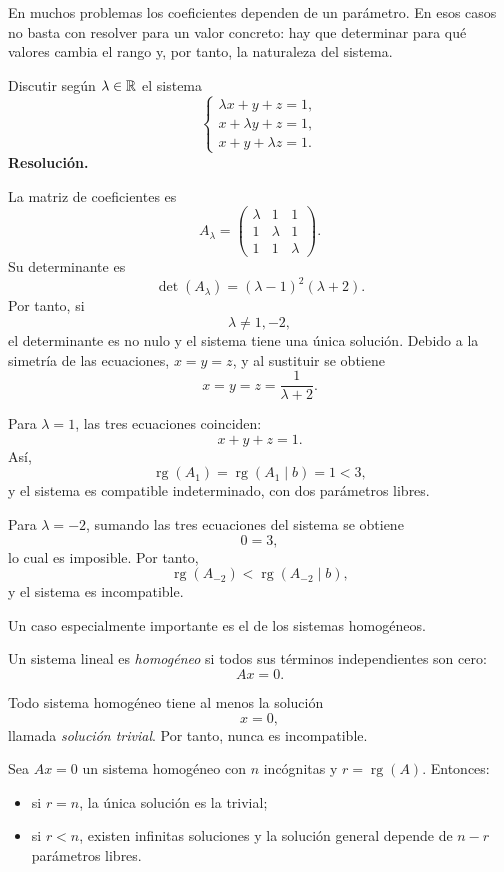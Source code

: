 En muchos problemas los coeficientes dependen de un parámetro. En esos casos no basta con resolver para un valor concreto: hay que determinar para qué valores cambia el rango y, por tanto, la naturaleza del sistema.

\begin{solvedexercise}
Discutir según $\lambda\in\mathbb{R}$ el sistema
\[
\begin{cases}
\lambda x+y+z=1,\\
x+\lambda y+z=1,\\
x+y+\lambda z=1.
\end{cases}
\]
\tcblower
\textbf{Resolución.}\par\smallskip
La matriz de coeficientes es
\[
A_\lambda=
\begin{pmatrix}
\lambda&1&1\\
1&\lambda&1\\
1&1&\lambda
\end{pmatrix}.
\]
Su determinante es
\[
\det(A_\lambda)
=(\lambda-1)^2(\lambda+2).
\]
Por tanto, si
\[
\lambda\neq1,-2,
\]
el determinante es no nulo y el sistema tiene una única solución. Debido a la simetría de las ecuaciones, $x=y=z$, y al sustituir se obtiene
\[
\boxed{x=y=z=\frac{1}{\lambda+2}}.
\]

Para $\lambda=1$, las tres ecuaciones coinciden:
\[
x+y+z=1.
\]
Así,
\[
\operatorname{rg}(A_1)=\operatorname{rg}(A_1\mid b)=1<3,
\]
y el sistema es compatible indeterminado, con dos parámetros libres.

Para $\lambda=-2$, sumando las tres ecuaciones del sistema se obtiene
\[
0=3,
\]
lo cual es imposible. Por tanto,
\[
\operatorname{rg}(A_{-2})<\operatorname{rg}(A_{-2}\mid b),
\]
y el sistema es incompatible.
\end{solvedexercise}

Un caso especialmente importante es el de los sistemas homogéneos.

\begin{definition}
Un sistema lineal es \emph{homogéneo} si todos sus términos independientes son cero:
\[
Ax=0.
\]
\end{definition}

Todo sistema homogéneo tiene al menos la solución
\[
x=0,
\]
llamada \emph{solución trivial}. Por tanto, nunca es incompatible.

\begin{theorem}
Sea $Ax=0$ un sistema homogéneo con $n$ incógnitas y $r=\operatorname{rg}(A)$. Entonces:
\begin{itemize}
\item si $r=n$, la única solución es la trivial;
\item si $r<n$, existen infinitas soluciones y la solución general depende de $n-r$ parámetros libres.
\end{itemize}
\end{theorem}


